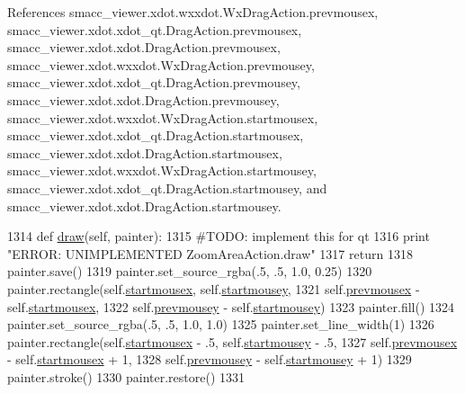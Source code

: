 References smacc\+\_\+viewer.\+xdot.\+wxxdot.\+Wx\+Drag\+Action.\+prevmousex, smacc\+\_\+viewer.\+xdot.\+xdot\+\_\+qt.\+Drag\+Action.\+prevmousex, smacc\+\_\+viewer.\+xdot.\+xdot.\+Drag\+Action.\+prevmousex, smacc\+\_\+viewer.\+xdot.\+wxxdot.\+Wx\+Drag\+Action.\+prevmousey, smacc\+\_\+viewer.\+xdot.\+xdot\+\_\+qt.\+Drag\+Action.\+prevmousey, smacc\+\_\+viewer.\+xdot.\+xdot.\+Drag\+Action.\+prevmousey, smacc\+\_\+viewer.\+xdot.\+wxxdot.\+Wx\+Drag\+Action.\+startmousex, smacc\+\_\+viewer.\+xdot.\+xdot\+\_\+qt.\+Drag\+Action.\+startmousex, smacc\+\_\+viewer.\+xdot.\+xdot.\+Drag\+Action.\+startmousex, smacc\+\_\+viewer.\+xdot.\+wxxdot.\+Wx\+Drag\+Action.\+startmousey, smacc\+\_\+viewer.\+xdot.\+xdot\+\_\+qt.\+Drag\+Action.\+startmousey, and smacc\+\_\+viewer.\+xdot.\+xdot.\+Drag\+Action.\+startmousey.


\begin{DoxyCode}
1314     \textcolor{keyword}{def }\hyperlink{classsmacc__viewer_1_1xdot_1_1xdot__qt_1_1ZoomAreaAction_aebb14cd4264834ee7c939623c06f604e}{draw}(self, painter):
1315         \textcolor{comment}{#TODO: implement this for qt}
1316         \textcolor{keywordflow}{print} \textcolor{stringliteral}{"ERROR: UNIMPLEMENTED ZoomAreaAction.draw"}
1317         \textcolor{keywordflow}{return}
1318         painter.save()
1319         painter.set\_source\_rgba(.5, .5, 1.0, 0.25)
1320         painter.rectangle(self.\hyperlink{classsmacc__viewer_1_1xdot_1_1xdot__qt_1_1DragAction_a0307070924910968e803a24cebb96496}{startmousex}, self.\hyperlink{classsmacc__viewer_1_1xdot_1_1xdot__qt_1_1DragAction_a9791a22420475034c612873b01e2c41b}{startmousey},
1321                      self.\hyperlink{classsmacc__viewer_1_1xdot_1_1xdot__qt_1_1DragAction_a900f12641fa6a10b8f1481533c50705e}{prevmousex} - self.\hyperlink{classsmacc__viewer_1_1xdot_1_1xdot__qt_1_1DragAction_a0307070924910968e803a24cebb96496}{startmousex},
1322                      self.\hyperlink{classsmacc__viewer_1_1xdot_1_1xdot__qt_1_1DragAction_aee3f8cd173e1043a06b4a08d9f84f536}{prevmousey} - self.\hyperlink{classsmacc__viewer_1_1xdot_1_1xdot__qt_1_1DragAction_a9791a22420475034c612873b01e2c41b}{startmousey})
1323         painter.fill()
1324         painter.set\_source\_rgba(.5, .5, 1.0, 1.0)
1325         painter.set\_line\_width(1)
1326         painter.rectangle(self.\hyperlink{classsmacc__viewer_1_1xdot_1_1xdot__qt_1_1DragAction_a0307070924910968e803a24cebb96496}{startmousex} - .5, self.\hyperlink{classsmacc__viewer_1_1xdot_1_1xdot__qt_1_1DragAction_a9791a22420475034c612873b01e2c41b}{startmousey} - .5,
1327                      self.\hyperlink{classsmacc__viewer_1_1xdot_1_1xdot__qt_1_1DragAction_a900f12641fa6a10b8f1481533c50705e}{prevmousex} - self.\hyperlink{classsmacc__viewer_1_1xdot_1_1xdot__qt_1_1DragAction_a0307070924910968e803a24cebb96496}{startmousex} + 1,
1328                      self.\hyperlink{classsmacc__viewer_1_1xdot_1_1xdot__qt_1_1DragAction_aee3f8cd173e1043a06b4a08d9f84f536}{prevmousey} - self.\hyperlink{classsmacc__viewer_1_1xdot_1_1xdot__qt_1_1DragAction_a9791a22420475034c612873b01e2c41b}{startmousey} + 1)
1329         painter.stroke()
1330         painter.restore()
1331 
\end{DoxyCode}
